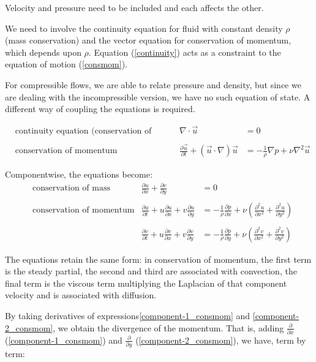 \documentclass[11pt]{article}
\begin{document}
Velocity and pressure need to be included and each affects the other.

We need to involve the continuity equation for fluid with constant density
$\rho$ (mass conservation) and the vector equation for conservation of
momentum, which depends upon $\rho$. Equation (\ref{continuity}) acts as
a constraint to the equation of motion (\ref{consmom}).

For compressible flows, we are able to relate pressure and density, but
since we are dealing with the incompressible version, we have no such
equation of state. A different way of coupling the equations is required.

\begin{align}
&\text{continuity equation (conservation of mass)}
	&\nabla \cdot \vec{u} &= 0	\label{continuity}
	\\ \nonumber \\
&\text{conservation of momentum}
	&\frac{\partial \vec{u}}{\partial t} + (\vec{u} \cdot \nabla) \vec{u}
	&= -\frac{1}{\rho} \nabla p + \nu \nabla ^2 \vec{u}
\label{consmom}
\end{align}
 
Componentwise, the equations become:
\begin{align}
&\text{conservation of mass}
	&\frac{\partial u}{\partial x} + \frac{\partial v}{\partial y} &= 0
	\label{component_consmass}
	\\ \nonumber \\
&\text{conservation of momentum}
	\label{component-1_consmom}
	&\frac{\partial u}{\partial t} + u\frac{\partial u}{\partial x} + v\frac{\partial u}{\partial y}
	&= -\frac{1}{\rho} \frac{\partial p}{\partial x} 
	+ \nu \left(\frac{\partial^2 u}{\partial x^2} + \frac{\partial^2 u}{\partial y^2}\right)
	\\ \nonumber \\
	&
	&\frac{\partial v}{\partial t} + u\frac{\partial v}{\partial x} + v\frac{\partial v}{\partial y}
	&= -\frac{1}{\rho} \frac{\partial p}{\partial y} 
	+ \nu \left(\frac{\partial^2 v}{\partial x^2} + \frac{\partial^2 v}{\partial y^2}\right)	
	\label{component-2_consmom}
\end{align}

The equations retain the same form: in conservation of momentum, the first term is the
steady partial, the second and third are associated with convection,
the final term is the viscous term multiplying the Laplacian of that
component velocity and is associated with diffusion.

By taking derivatives of expressions\ref{component-1_consmom} and \ref{component-2_consmom},
we obtain the divergence of the momentum. That is, adding $\frac{\partial }{\partial x}$
(\ref{component-1_consmom}) and $\frac{\partial }{\partial y}$ (\ref{component-2_consmom}),
we have, term by term:
\end{document}
